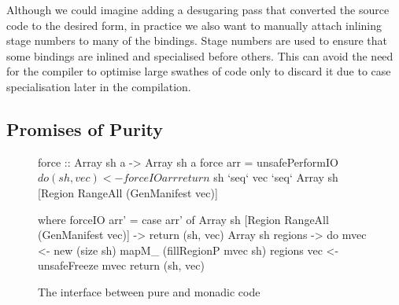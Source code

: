Although we could imagine adding a desugaring pass that converted the source code to the desired form, in practice we also want to manually attach inlining stage numbers to many of the bindings. Stage numbers are used to ensure that some bindings are inlined and specialised before others. This can avoid the need for the compiler to optimise large swathes of code only to discard it due to case specialisation later in the compilation.



\subsection{Promises of Purity}
\begin{figure}
\begin{small}
\begin{code}
force :: Array sh a -> Array sh a
force arr
 = unsafePerformIO
 $ do (sh, vec) <- forceIO arr
       return $ sh `seq` vec `seq` 
         Array sh [Region RangeAll (GenManifest vec)]

 where forceIO arr'
        = case arr' of
           Array sh [Region RangeAll (GenManifest vec)]
            -> return (sh, vec)
           Array sh regions
            -> do mvec <- new (size sh)
                  mapM_ (fillRegionP mvec sh) regions
                  vec  <- unsafeFreeze mvec
                  return (sh, vec)
\end{code}
\end{small}
\caption{The interface between pure and monadic code}
\label{fig:TheForce}
\end{figure}


